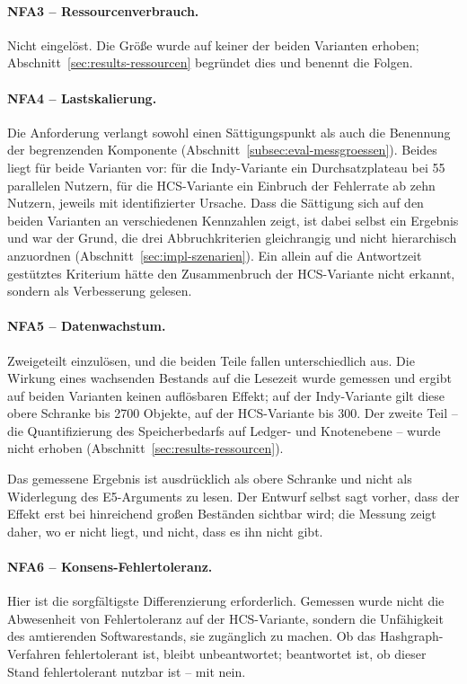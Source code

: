 \paragraph{NFA3 -- Ressourcenverbrauch.} Nicht eingelöst. Die Größe wurde auf keiner der beiden Varianten erhoben; Abschnitt~\ref{sec:results-ressourcen} begründet dies und benennt die Folgen.

\paragraph{NFA4 -- Lastskalierung.} Die Anforderung verlangt sowohl einen Sättigungspunkt als auch die Benennung der begrenzenden Komponente (Abschnitt~\ref{subsec:eval-messgroessen}). Beides liegt für beide Varianten vor: für die Indy-Variante ein Durchsatzplateau bei 55 parallelen Nutzern, für die HCS-Variante ein Einbruch der Fehlerrate ab zehn Nutzern, jeweils mit identifizierter Ursache. Dass die Sättigung sich auf den beiden Varianten an verschiedenen Kennzahlen zeigt, ist dabei selbst ein Ergebnis und war der Grund, die drei Abbruchkriterien gleichrangig und nicht hierarchisch anzuordnen (Abschnitt~\ref{sec:impl-szenarien}). Ein allein auf die Antwortzeit gestütztes Kriterium hätte den Zusammenbruch der HCS-Variante nicht erkannt, sondern als Verbesserung gelesen.

\paragraph{NFA5 -- Datenwachstum.} Zweigeteilt einzulösen, und die beiden Teile fallen unterschiedlich aus. Die Wirkung eines wachsenden Bestands auf die Lesezeit wurde gemessen und ergibt auf beiden Varianten keinen auflösbaren Effekt; auf der Indy-Variante gilt diese obere Schranke bis 2700 Objekte, auf der HCS-Variante bis 300. Der zweite Teil -- die Quantifizierung des Speicherbedarfs auf Ledger- und Knotenebene -- wurde nicht erhoben (Abschnitt~\ref{sec:results-ressourcen}).

Das gemessene Ergebnis ist ausdrücklich als obere Schranke und nicht als Widerlegung des E5-Arguments zu lesen. Der Entwurf selbst sagt vorher, dass der Effekt erst bei hinreichend großen Beständen sichtbar wird; die Messung zeigt daher, wo er nicht liegt, und nicht, dass es ihn nicht gibt.

\paragraph{NFA6 -- Konsens-Fehlertoleranz.} Hier ist die sorgfältigste Differenzierung erforderlich. Gemessen wurde nicht die Abwesenheit von Fehlertoleranz auf der HCS-Variante, sondern die Unfähigkeit des amtierenden Softwarestands, sie zugänglich zu machen. Ob das Hashgraph-Verfahren fehlertolerant ist, bleibt unbeantwortet; beantwortet ist, ob dieser Stand fehlertolerant nutzbar ist -- mit nein.

